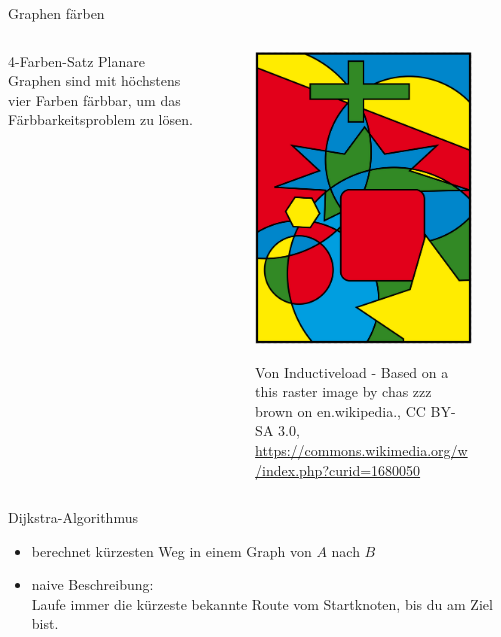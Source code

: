 \documentclass[18pt]{beamer}
\begin{document}
    \begin{frame}{Graphen färben}
        \begin{columns}
            \begin{column}{.5\textwidth}
                \begin{block}{4-Farben-Satz}
                    Planare Graphen sind mit höchstens vier Farben färbbar, um das Färbbarkeitsproblem zu lösen.
                \end{block}
            \end{column}
            \begin{column}{.5\textwidth}
                \begin{figure}[]
                    \centering
                    \includegraphics[keepaspectratio, width=.7\textwidth]{figures/4Farben.png}

                    \tiny Von Inductiveload - Based on a this raster image by chas zzz brown on en.wikipedia., 
                    CC BY-SA 3.0, \url{https://commons.wikimedia.org/w/index.php?curid=1680050}
                \end{figure}
            \end{column}
        \end{columns}   
    \end{frame}

    \begin{frame}{Dijkstra-Algorithmus}
        \begin{itemize}[<+->]
            \item berechnet kürzesten Weg in einem Graph von $A$ nach $B$
            \item naive Beschreibung:\\
                Laufe immer die kürzeste bekannte Route vom Startknoten, 
                bis du am Ziel bist.
        \end{itemize}
    \end{frame}
\end{document}

